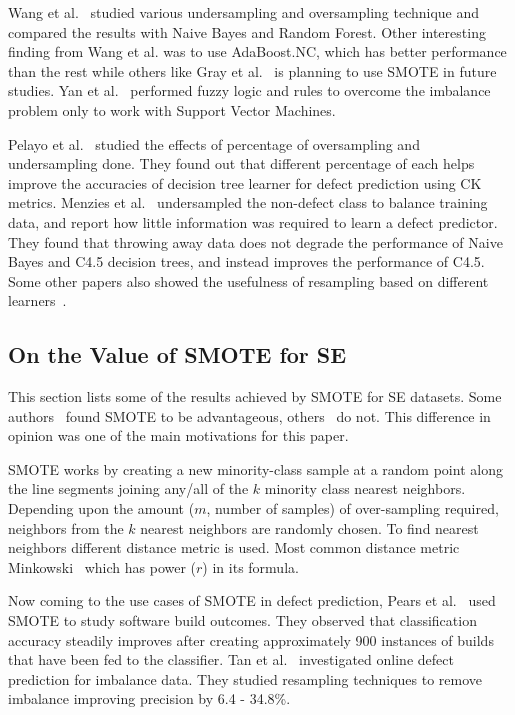 \documentclass[10pt,conference]{IEEEtran}
\theoremstyle{break}
\theoremstyle{break}
\begin{document}
Wang et al.~\cite{wang2013using} studied various undersampling and oversampling technique and compared the results with Naive Bayes and Random Forest. Other interesting finding from Wang et al. was to use AdaBoost.NC, which has better performance than the rest while others like Gray et al.~\cite{gray2009using} is planning to use SMOTE in future studies. Yan et al.~\cite{yan2010software} performed fuzzy logic and rules to overcome the imbalance problem only to work with Support Vector Machines. 

Pelayo et al.~\cite{pelayo2007applying} studied the effects of percentage of oversampling and undersampling done. They found out that different percentage of each helps improve the accuracies of decision tree learner for defect prediction using CK metrics. Menzies et al.~\cite{menzies2008implications} undersampled the non-defect class to balance training
data, and report how little information was required to learn a defect predictor. They found that throwing away data does not degrade the performance of Naive Bayes and C4.5 decision trees, and instead improves the performance of C4.5. Some other papers also showed the usefulness of resampling based on different learners~\cite{pelayo2007applying, pelayo2012evaluating, riquelme2008finding}.

\subsection{On the Value of SMOTE for SE}
\label{sect:smote}

This section lists some of the results achieved by SMOTE for SE datasets. Some authors~\cite{van2007experimental, tan2015online} found SMOTE to be advantageous, others~\cite{pelayo2007applying} do not. This 
difference in opinion was one of the main motivations
for this paper.

SMOTE works by creating a new minority-class sample at a random point along the line
segments joining any/all of the $k$ minority class nearest neighbors. Depending upon the
amount ($m$, number of samples) of over-sampling required, neighbors from the $k$ nearest neighbors are randomly
chosen. To find nearest neighbors different distance metric is used. Most common distance metric Minkowski~\cite{deza2009encyclopedia} which has power ($r$) in its formula.

Now coming to the use cases of SMOTE in defect prediction, Pears et al.~\cite{pears2014synthetic} used SMOTE to study software build outcomes. They observed
that classification accuracy steadily improves after creating approximately 900 instances of builds that have been fed to the classifier. Tan et al.~\cite{tan2015online} investigated online defect prediction for imbalance data. They studied resampling techniques to remove imbalance improving precision by 6.4 - 34.8\%.
\end{document}

